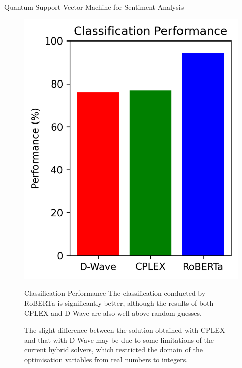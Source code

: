 \documentclass[final]{beamer}
\newlength{\colwidth}
\begin{document}
\begin{frame}[t,fragile]
\begin{columns}[t]
\begin{column}{\colwidth}
\begin{block}{Quantum Support Vector Machine for Sentiment Analysis}
    \begin{figure}[h!]
      \centering
      \begin{minipage}{0.3\textwidth}
          \centering
          \includegraphics[height=0.15\textheight]{logos/performance.png}
      \end{minipage}%
      \hfill
      \begin{minipage}{0.65\textwidth}
        \begin{alertblock}{Classification Performance}
          The classification conducted by RoBERTa is significantly better, although the results of both CPLEX and D-Wave are also well above random guesses.
          
          The slight difference between the solution obtained with CPLEX and that with D-Wave may be due to some limitations of the current hybrid solvers, which restricted the domain of the optimisation variables from real numbers to integers.
        \end{alertblock}
      \end{minipage}
    \end{figure}


\end{block}
\end{column}
\end{columns}
\end{frame}
\end{document}
